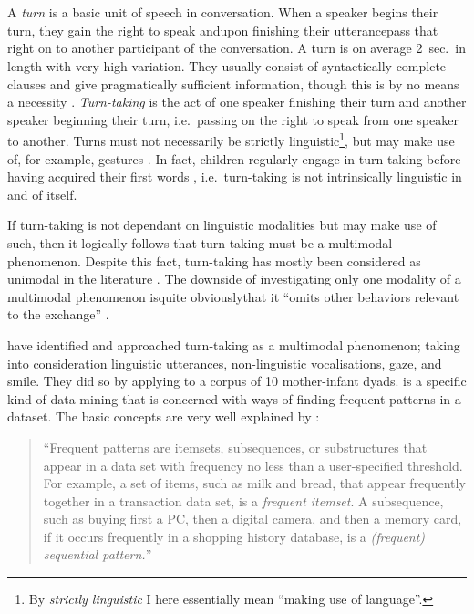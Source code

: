 
\chapter{\introduction}
\label{ch:introduction}
A \emph{turn} is a basic unit of speech in conversation. When a speaker begins their turn, they gain the right to speak and\dash upon finishing their utterance\dash pass that right on to another participant of the conversation. A turn is on average 2~sec.\ in length with very high variation. They usually consist of syntactically complete clauses and give pragmatically sufficient information, though this is by no means a necessity \citep[]{levinson16}.
\emph{Turn-taking} is the act of one speaker finishing their turn and another speaker beginning their turn, i.e.\ passing on the right to speak from one speaker to another. Turns must not necessarily be strictly linguistic\footnote{By \emph{strictly linguistic} I here essentially mean ``making use of language''.}, but may make use of, for example, gestures \citep{missingsource}. In fact, children regularly engage in turn-taking before having acquired their first words \citep[]{casillas16}, i.e.\ turn-taking is not intrinsically linguistic in and of itself.

If turn-taking is not dependant on linguistic modalities but may make use of such, then it logically follows that turn-taking must be a multimodal phenomenon. Despite this fact, turn-taking has mostly been considered as unimodal in the literature \citep[]{rohlfing18}. The downside of investigating only one modality of a multimodal phenomenon is\dash quite obviously\dash that it ``omits other behaviors relevant to the exchange'' \citep[]{rohlfing18}.

\citet{rohlfing18} have identified and approached turn-taking as a multimodal phenomenon; taking into consideration linguistic utterances, non-linguistic vocalisations, gaze, and smile. They did so by applying \fpmlower to a corpus of 10 mother-infant dyads. \fpmsentence is a specific kind of data mining that is concerned with ways of finding frequent patterns in a dataset. The basic concepts are very well explained by \citet{han07}:

\begin{quote}
``Frequent patterns are itemsets, subsequences, or substructures that appear in a data set with frequency no less than a user-specified threshold. For example, a set of items, such as milk and bread, that appear frequently together in a transaction data set, is a \emph{frequent itemset}. A subsequence, such as buying first a PC, then a digital camera, and then a memory card, if it occurs frequently in a shopping history database, is a \emph{(frequent) sequential pattern.}'' \hfill \citep[]{han07}
\end{quote}

